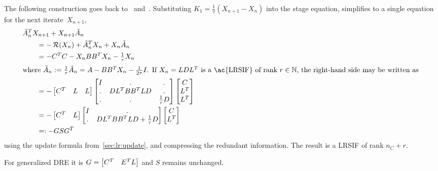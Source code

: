 The following construction goes back to~\cite[Section~4.3.3]{Mena2007} and~\cite[Section~6.2.2]{Lang2017}.
Substituting $K_1 = \frac{1}{\tau}(X_{n+1} - X_n)$ into the stage equation,
 simplifies to a single \Lyapunov equation for the next iterate~$X_{n+1}$,
\begin{subequations}
\begin{align}
  \MoveEqLeft
  \tilde A_n^\T X_{n+1} + X_{n+1} \tilde A_n
  \nonumber \\
  &= -\Ricc(X_n) +
  \tilde A_n^\T X_n + X_n \tilde A_n \\
  &= -C^\T C - X_n BB^\T X_n - \tfrac{1}{\tau} X_n \\
\intertext{%
where $\tilde A_n := \frac{1}{\tau} \hat A_n = A - BB^\T X_n - \frac{1}{2\tau} I$.
If $X_n = LDL^\T$ is a \ac{LRSIF} of rank $r\in\N$,
the right-hand side may be written as
}
  &= -\begin{bmatrix}
    C^\T & L & L
  \end{bmatrix}
  \begin{bmatrix}
    I & . & . \\
    . & DL^\T BB^\T LD & . \\
    . & . & \tfrac{1}{\tau} D
  \end{bmatrix}
  \begin{bmatrix}
    C \\ L^\T \\ L^\T
  \end{bmatrix} \\
  \label{eq:ros:lr-condensed:1}
  &= -\begin{bmatrix}
    C^\T & L
  \end{bmatrix}
  \begin{bmatrix}
    I & . \\
    . & DL^\T BB^\T LD + \tfrac{1}{\tau} D
  \end{bmatrix}
  \begin{bmatrix}
    C \\ L^\T
  \end{bmatrix} \\
  &=: -GSG^\T
\end{align}
\end{subequations}
using the update formula from~\autoref{sec:lr:update},
and compressing the redundant information.
The result is a \ac{LRSIF} of rank $n_C + r$.

\begin{remark}
  For generalized \ac{DRE} it is $G = \begin{bmatrix}
    C^T & E^T L
  \end{bmatrix}$ and $S$ remains unchanged.
\end{remark}

